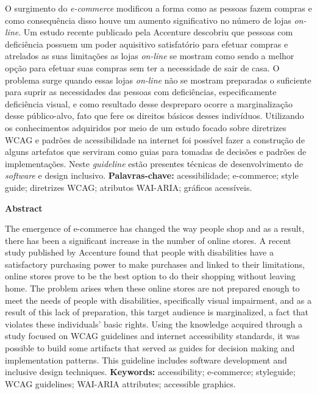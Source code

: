 
{O surgimento do \textit{e-commerce} modificou a forma como as pessoas fazem compras e como consequência disso houve um aumento significativo no número de lojas \textit{on-line}. Um estudo recente publicado pela Accenture descobriu que pessoas com deficiência possuem um poder aquisitivo satisfatório para efetuar compras e atrelados as suas limitações as lojas \textit{on-line} se mostram como sendo a melhor opção para efetuar suas compras sem ter a necessidade de sair de casa. O problema surge quando essas lojas \textit{on-line} não se mostram preparadas o suficiente para suprir as necessidades das pessoas com deficiências, especificamente deficiência visual, e como resultado desse despreparo ocorre a marginalização desse público-alvo, fato que fere os direitos básicos desses indivíduos. Utilizando os conhecimentos adquiridos por meio de um estudo focado sobre diretrizes WCAG e padrões de acessibilidade na internet foi possível fazer a construção de alguns artefatos que serviram como guias para tomadas de decisões e padrões de implementações. Neste \textit{guideline} estão presentes técnicas de desenvolvimento de \textit{software} e design inclusivo.
\vspace{1,5cm}
\newline
\textbf{Palavras-chave:} acessibilidade; e-commerce; style guide; diretrizes WCAG; atributos WAI-ARIA; gráficos acessíveis.
} 



\vspace{60px}
{

\centerline{\textbf{Abstract}}
\vspace{10px}
The emergence of e-commerce has changed the way people shop and as a result, there has been a significant increase in the number of online stores. A recent study published by Accenture found that people with disabilities have a satisfactory purchasing power to make purchases and linked to their limitations, online stores prove to be the best option to do their shopping without leaving home. The problem arises when these online stores are not prepared enough to meet the needs of people with disabilities, specifically visual impairment, and as a result of this lack of preparation, this target audience is marginalized, a fact that violates these individuals' basic rights. Using the knowledge acquired through a study focused on WCAG guidelines and internet accessibility standards, it was possible to build some artifacts that served as guides for decision making and implementation patterns. This guideline includes software development and inclusive design techniques.
\vspace{1,5cm}
\newline
\textbf{Keywords:} accessibility; e-commerce; styleguide; WCAG guidelines; WAI-ARIA attributes; accessible graphics.

}